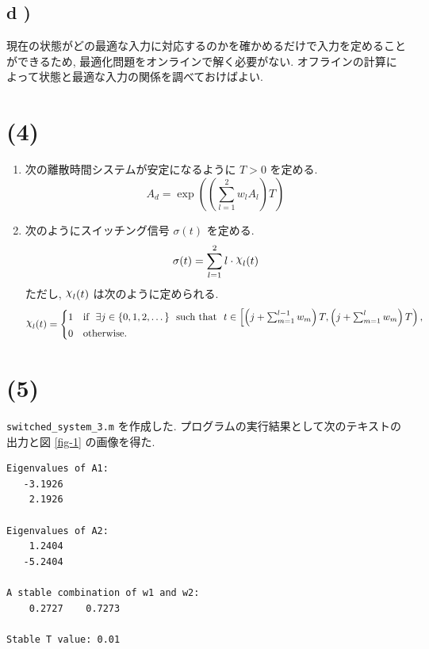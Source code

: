 \documentclass[10pt, fleqn, dvipdfmx]{article}
\DeclareRobustCommand{\rchi}{{\mathpalette\irchi\relax}}
\newcommand{\irchi}[2]{\raisebox{\depth}{$#1\chi$}}
\begin{document}
\subsection*{d )}

現在の状態がどの最適な入力に対応するのかを確かめるだけで入力を定めることができるため,
最適化問題をオンラインで解く必要がない.
オフラインの計算によって状態と最適な入力の関係を調べておけばよい.

\section*{(4)}

\begin{enumerate}
	\item 次の離散時間システムが安定になるように $T > 0$ を定める.
	      \begin{equation}
		      A_d = \exp \left( \left( \sum_{l=1}^2 w_l A_l \right) T \right)
	      \end{equation}
	\item 次のようにスイッチング信号 $\sigma(t)$ を定める.
	      \begin{equation}
		      \sigma (t) = \sum_{l=1}^2 l \cdot \rchi_{l} (t)
	      \end{equation}
	      ただし, $\rchi_{l} (t)$ は次のように定められる.
	      \begin{equation}
		      \rchi_{l} (t) = \begin{cases}
			      1 & \text{if} ~~
			      \exists j \in \{ 0, 1, 2, \dots \} ~~
			      \text{such that} ~~ t \in \left[ \left( j + \sum_{m=1}^{l-1} w_m \right) T, \left( j + \sum_{m=1}^l w_m \right) T \right), \\
			      0 & \text{otherwise}.
		      \end{cases}
	      \end{equation}
\end{enumerate}

\section*{(5)}

\texttt{switched\_system\_3.m} を作成した.
プログラムの実行結果として次のテキストの出力と図 \ref{fig-1} の画像を得た.

\begin{lstlisting}
Eigenvalues of A1:
   -3.1926
    2.1926

Eigenvalues of A2:
    1.2404
   -5.2404

A stable combination of w1 and w2:
    0.2727    0.7273

Stable T value: 0.01
\end{lstlisting}
\end{document}
